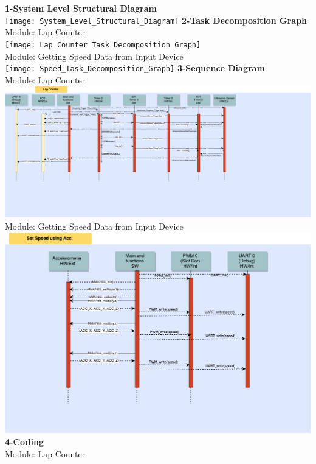 \documentclass{article}
\begin{document}
{\huge\textbf {1-System Level Structural Diagram}}
\\
\texttt{[image: System\_Level\_Structural\_Diagram]}
\pagebreak
{\huge\textbf {2-Task Decomposition Graph}}
\\
{\huge {Module: Lap Counter}}
\\
\texttt{[image: Lap\_Counter\_Task\_Decomposition\_Graph]}
\\[0.2in]
{\huge {Module: Getting Speed Data from Input Device}}
\\[0.2in]
\texttt{[image: Speed\_Task\_Decomposition\_Graph]}
\clearpage
{\huge\textbf {3-Sequence Diagram}}
\\
{\huge {Module: Lap Counter}}
\\
\includegraphics[scale=0.3]{Lap_Counter_Seq_Diagram}
\\
{\huge {Module: Getting Speed Data from Input Device}}
\\
\includegraphics[scale=0.5]{Read_Acc_Control_Speed}
\clearpage
{\huge\textbf {4-Coding}}
\\
{\huge {Module: Lap Counter}}
\\
\end{document}
